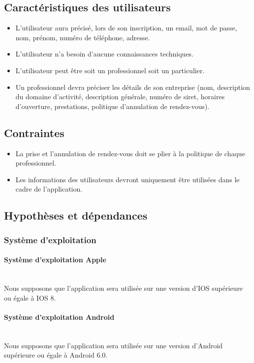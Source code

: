 \documentclass{article}
\begin{document}
\subsection{Caractéristiques des utilisateurs}
\begin{itemize}
\item L'utilisateur aura précisé, lors de son inscription, un email, mot
de passe, nom, prénom, numéro de téléphone, adresse.
\item L'utilisateur n'a besoin d'aucune connaissances techniques.
\item L'utilisateur peut être soit un professionnel soit un particulier.
\item Un professionnel devra préciser les détails de son entreprise (nom, description du
	domaine d'activité, description générale, numéro de siret, horaires d'ouverture, prestations, politique d'annulation de rendez-vous).
\end{itemize}
\subsection{Contraintes}
\begin{itemize}
\item La prise et l'annulation de rendez-vous doit se plier à la
  politique de chaque professionnel.
\item Les informations des utilisateurs devront uniquement être
  utilisées dans le cadre de l'application.
\end{itemize}
\subsection{Hypothèses et dépendances}
\subsubsection{Système d'exploitation}
\paragraph{Système d'exploitation Apple}
~~\\Nous supposons que l'application sera utilisée sur une version d'IOS supérieure ou égale à IOS 8.
\paragraph{Système d'exploitation Android}
~~\\ Nous supposons que l'application sera utilisée sur une version d'Android supérieure ou égale à Android 6.0.
\end{document}
